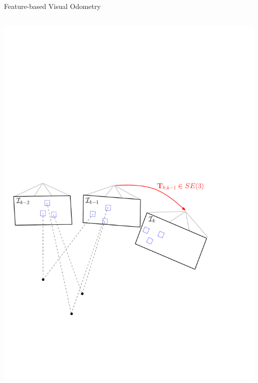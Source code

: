 \documentclass[10pt]{beamer}
\begin{document}
\begin{frame}{Feature-based Visual Odometry}
\begin{columns}
\begin{column}{0.6\textwidth}
	    \includegraphics[width=\textwidth]{img/vo_pipeline_3}
	  \end{column}
	\end{columns}
\end{frame}
\end{document}
